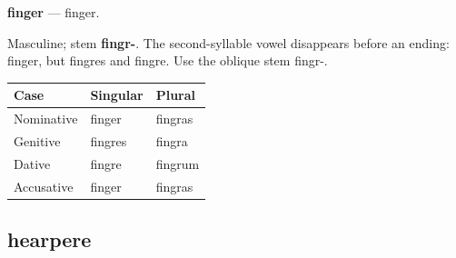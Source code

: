 \par\begin{minipage}{\linewidth}\raggedright
\textbf{finger} — finger.

Masculine; stem \textbf{fingr-}. The second-syllable vowel disappears before an ending: finger, but fingres and fingre. Use the oblique stem fingr-.

\par\begingroup
\fontsize{10.5}{13.2}\selectfont
\setlength{\LTleft}{0pt}\setlength{\LTright}{\fill}
\noindent
\begin{tabular}{@{}>{\raggedright\arraybackslash}p{39.46mm}>{\raggedright\arraybackslash}p{39.46mm}>{\raggedright\arraybackslash}p{39.46mm}@{}}
\toprule
\textbf{Case} & \textbf{Singular} & \textbf{Plural} \\
\midrule
Nominative & finger & fingras \\
Genitive & fingres & fingra \\
Dative & fingre & fingrum \\
Accusative & finger & fingras \\
\bottomrule
\end{tabular}
\par\endgroup

\end{minipage}\par
{}
\subsection*{hearpere}

